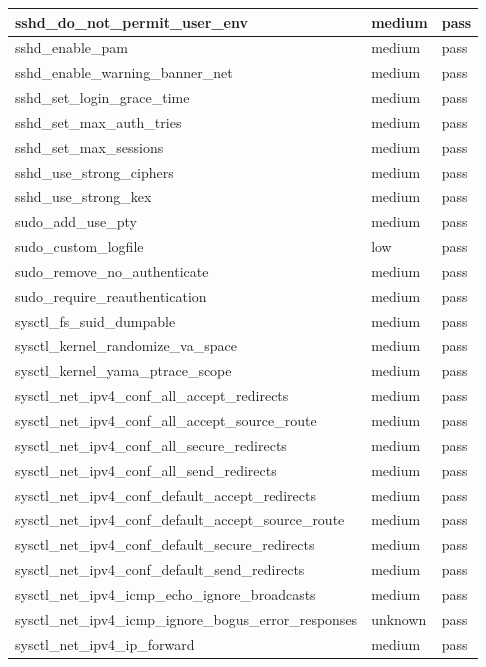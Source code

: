 \begin{longtable}{|p{10cm}|p{2cm}|p{2cm}|}
\hline
sshd\_do\_not\_permit\_user\_env & medium & pass \\
\hline
sshd\_enable\_pam & medium & pass \\
\hline
sshd\_enable\_warning\_banner\_net & medium & pass \\
\hline
sshd\_set\_login\_grace\_time & medium & pass \\
\hline
sshd\_set\_max\_auth\_tries & medium & pass \\
\hline
sshd\_set\_max\_sessions & medium & pass \\
\hline
sshd\_use\_strong\_ciphers & medium & pass \\
\hline
sshd\_use\_strong\_kex & medium & pass \\
\hline
sudo\_add\_use\_pty & medium & pass \\
\hline
sudo\_custom\_logfile & low & pass \\
\hline
sudo\_remove\_no\_authenticate & medium & pass \\
\hline
sudo\_require\_reauthentication & medium & pass \\
\hline
sysctl\_fs\_suid\_dumpable & medium & pass \\
\hline
sysctl\_kernel\_randomize\_va\_space & medium & pass \\
\hline
sysctl\_kernel\_yama\_ptrace\_scope & medium & pass \\
\hline
sysctl\_net\_ipv4\_conf\_all\_accept\_redirects & medium & pass \\
\hline
sysctl\_net\_ipv4\_conf\_all\_accept\_source\_route & medium & pass \\
\hline
sysctl\_net\_ipv4\_conf\_all\_secure\_redirects & medium & pass \\
\hline
sysctl\_net\_ipv4\_conf\_all\_send\_redirects & medium & pass \\
\hline
sysctl\_net\_ipv4\_conf\_default\_accept\_redirects & medium & pass \\
\hline
sysctl\_net\_ipv4\_conf\_default\_accept\_source\_route & medium & pass \\
\hline
sysctl\_net\_ipv4\_conf\_default\_secure\_redirects & medium & pass \\
\hline
sysctl\_net\_ipv4\_conf\_default\_send\_redirects & medium & pass \\
\hline
sysctl\_net\_ipv4\_icmp\_echo\_ignore\_broadcasts & medium & pass \\
\hline
sysctl\_net\_ipv4\_icmp\_ignore\_bogus\_error\_responses & unknown & pass \\
\hline
sysctl\_net\_ipv4\_ip\_forward & medium & pass \\

\end{longtable}
